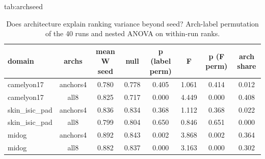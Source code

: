 \begin{table}[t]
\floatconts
  {tab:archseed}
  {\caption{Does architecture explain ranking variance beyond seed? Arch-label permutation of the 40 runs and nested ANOVA on within-run ranks.}}
  {\small
  \begin{tabular}{@{}lccccccc@{}}
  \toprule
  domain & archs & mean W seed & null & p (label perm) & F & p (F perm) & arch share \\
  \midrule
  camelyon17 & anchors4 & 0.780 & 0.778 & 0.405 & 1.061 & 0.414 & 0.012 \\
  camelyon17 & all8 & 0.825 & 0.717 & 0.000 & 4.449 & 0.000 & 0.408 \\
  skin\_isic\_pad & anchors4 & 0.836 & 0.834 & 0.368 & 1.112 & 0.368 & 0.022 \\
  skin\_isic\_pad & all8 & 0.799 & 0.804 & 0.650 & 0.846 & 0.651 & 0.000 \\
  midog & anchors4 & 0.892 & 0.843 & 0.002 & 3.868 & 0.002 & 0.364 \\
  midog & all8 & 0.882 & 0.837 & 0.000 & 3.163 & 0.000 & 0.302 \\
  \bottomrule
  \end{tabular}}
\end{table}
